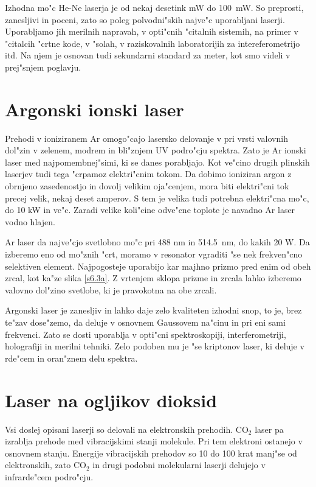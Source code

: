 Izhodna mo"c He-Ne laserja je od nekaj desetink mW do 100~mW. So preprosti,
zanesljivi in poceni, zato so poleg polvodni"skih najve"c uporabljani
laserji. Uporabljamo jih merilnih napravah, v opti"cnih "citalnih sistemih,
na primer v "citalcih "crtne kode, v "solah, v raziskovalnih laboratorijih
za intereferometrijo itd. Na njem je osnovan tudi sekundarni standard za
meter, kot smo videli v prej"snjem poglavju.

\section{Argonski ionski laser}

Prehodi v ioniziranem Ar omogo"cajo lasersko delovanje v pri vrsti valovnih
dol"zin v zelenem, modrem in bli"znjem UV podro"cju spektra. Zato je Ar
ionski laser med najpomembnej"simi, ki se danes porabljajo. Kot ve"cino
drugih plinskih laserjev tudi tega "crpamoz elektri"cnim tokom. Da dobimo
ioniziran argon z obrnjeno zasedenostjo in dovolj velikim oja"cenjem, mora
biti elektri"cni tok precej velik, nekaj deset amperov. S tem je velika tudi
potrebna elektri"cna mo"c, do 10 kW in ve"c. Zaradi velike koli"cine
odve"cne toplote je navadno Ar laser vodno hlajen.

Ar laser da najve"cjo svetlobno mo"c pri 488 nm in 514.5~nm, do kakih 20 W.
Da izberemo eno od mo"znih "crt, moramo v resonator vgraditi "se nek
frekven"cno selektiven element. Najpogosteje uporabijo kar majhno prizmo
pred enim od obeh zrcal, kot ka"ze slika \ref{s6.3a}. Z vrtenjem sklopa
prizme in zrcala lahko izberemo valovno dol"zino svetlobe, ki je pravokotna
na obe zrcali.

Argonski laser je zanesljiv in lahko daje zelo kvaliteten izhodni snop, to
je, brez te"zav dose"zemo, da deluje v osnovnem Gaussovem na"cinu in pri eni
sami frekvenci. Zato se dosti uporablja v opti"cni spektroskopiji,
interferometriji, holografiji in merilni tehniki. Zelo podoben mu je "se
kriptonov laser, ki deluje v rde"cem in oran"znem delu spektra.

\section{Laser na ogljikov dioksid}

Vsi doslej opisani laserji so delovali na elektronskih prehodih. CO$_2$
laser pa izrablja prehode med vibracijskimi stanji molekule. Pri tem
elektroni ostanejo v osnovnem stanju. Energije vibracijskih prehodov so 10
do 100 krat manj"se od elektronskih, zato CO$_2$ in drugi podobni
molekularni laserji delujejo v infrarde"cem podro"cju.

